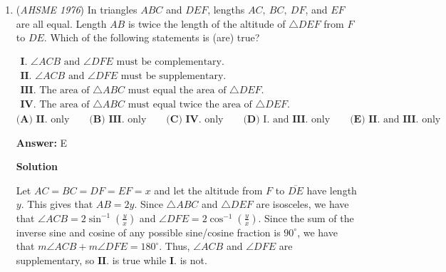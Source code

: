 \begin{enumerate}
 
Let's make a new congruence by subtracting (i) from (ii), which results in 
 \[358 \equiv 0 \pmod{d}.\]Subtract (ii) from (iii) to get 
 \[895 \equiv 0 \pmod{d}.\]

 
Now we know that $358$ and $895$ are both multiples of $d$. Their prime factorizations are $358=2 \cdot 179$ and $895=5 \cdot 179$, so their common factor is $179$, which means $d=179$.

 
Plug $d=179$ back into any of the original congruences to get $r=164$. Then, $d-r=179-164= \boxed{\textbf{(B) }15}$. ~\href{https://artofproblemsolving.com/wiki/index.php?title=User:Jiang147369}{jiang147369}

 


 


	\item (\textit{AHSME 1976}) In triangles $ABC$ and $DEF$, lengths $AC,~BC,~DF$, and $EF$ are all equal. Length $AB$ is twice the length of the altitude of $\triangle DEF$
from $F$ to $DE$. Which of the following statements is (are) true?


 $\begin{array}{l}\textbf{I. }\angle ACB \text{ and }\angle DFE\text{ must be complementary.}\\ \textbf{II. }\angle ACB \text{ and }\angle DFE\text{ must be supplementary.}\\ \textbf{III. }\text{The area of }\triangle ABC\text{ must equal the area of }\triangle DEF.\\ \textbf{IV. }\text{The area of }\triangle ABC\text{ must equal twice the area of }\triangle DEF.\end{array}$
$\textbf{(A) }\textbf{II. }\text{only}\qquad \textbf{(B) }\textbf{III. }\text{only}\qquad \textbf{(C) }\textbf{IV. }\text{only}\qquad \textbf{(D) }\text{I. }\text{and }\textbf{III. }\text{only}\qquad  \textbf{(E) }\textbf{II. }\text{and }\textbf{III. }\text{only}$

 \textbf{Answer: }E



\textbf{Solution}

Let $AC=BC=DF=EF=x$ and let the altitude from $F$ to $\overline{DE}$ have length $y$. This gives that $AB=2y$. Since $\triangle ABC$ and $\triangle DEF$ are isosceles, we have that $\angle ACB = 2\sin ^{-1} \left(\frac{y}{x} \right)$ and $\angle DFE = 2\cos ^{-1} \left(\frac{y}{x} \right)$. Since the sum of the inverse sine and cosine of any possible sine/cosine fraction is $90^\circ$, we have that $m \angle ACB + m \angle DFE = 180^\circ$. Thus, $\angle ACB$ and $\angle DFE$ are supplementary, so $\mathbf{II.}$ is true while $\mathbf{I.}$ is not. 


\end{enumerate}
